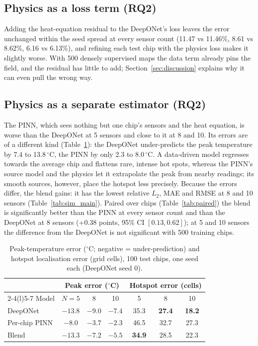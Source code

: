 \documentclass[journal]{IEEEtran}
\newcommand{\best}[1]{\textbf{#1}}
\begin{document}
\subsection{Physics as a loss term (RQ2)}
Adding the heat-equation residual to the DeepONet's loss leaves the error unchanged within the seed spread at every sensor count (11.47 vs 11.46\%, 8.61 vs 8.62\%, 6.16 vs 6.13\%), and refining each test chip with the physics loss makes it slightly worse.
With 500 densely supervised maps the data term already pins the field, and the residual has little to add; Section~\ref{sec:discussion} explains why it can even pull the wrong way.

\subsection{Physics as a separate estimator (RQ2)}
The PINN, which sees nothing but one chip's sensors and the heat equation, is worse than the DeepONet at 5 sensors and close to it at 8 and 10.
Its errors are of a different kind (Table~\ref{tab:peak}): the DeepONet under-predicts the peak temperature by 7.4 to 13.8\,$^\circ$C, the PINN by only 2.3 to 8.0\,$^\circ$C.
A data-driven model regresses towards the average chip and flattens rare, intense hot spots, whereas the PINN's source model and the physics let it extrapolate the peak from nearby readings; its smooth sources, however, place the hotspot less precisely.
Because the errors differ, the blend gains: it has the lowest relative $L_2$, MAE and RMSE at 8 and 10 sensors (Table~\ref{tab:sim_main}).
Paired over chips (Table~\ref{tab:paired}) the blend is significantly better than the PINN at every sensor count and than the DeepONet at 8 sensors (+0.38 points, 95\% CI $[0.13,0.62]$); at 5 and 10 sensors the difference from the DeepONet is not significant with 500 training chips.

\begin{table}[t]
\caption{Peak-temperature error ($^\circ$C; negative = under-prediction) and hotspot localisation error (grid cells), 100 test chips, one seed each (DeepONet seed 0).}
\label{tab:peak}
\centering
\footnotesize
\setlength{\tabcolsep}{4pt}
\begin{tabular}{@{}l ccc ccc@{}}
\toprule
& \multicolumn{3}{c}{Peak error ($^\circ$C)} & \multicolumn{3}{c}{Hotspot error (cells)} \\
\cmidrule(lr){2-4}\cmidrule(l){5-7}
Model & $N{=}5$ & 8 & 10 & 5 & 8 & 10 \\
\midrule
DeepONet & $-13.8$ & $-9.0$ & $-7.4$ & 35.3 & \best{27.4} & \best{18.2} \\
Per-chip PINN & \best{$-8.0$} & \best{$-3.7$} & \best{$-2.3$} & 46.5 & 32.7 & 27.3 \\
Blend & $-13.3$ & $-7.2$ & $-5.5$ & \best{34.9} & 28.5 & 22.3 \\
\bottomrule
\end{tabular}
\end{table}
\end{document}
